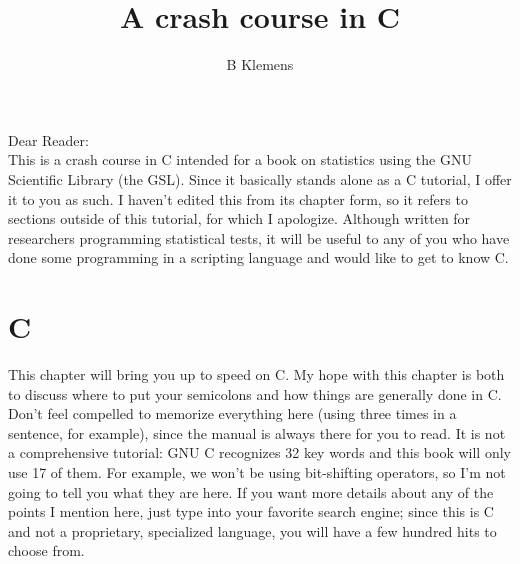 \documentclass[12pt]{article}
\begin{document}
	\title{A crash course in C}
	\author{B Klemens}
	\maketitle


Dear Reader:\\
This is a crash course in C intended for a book on statistics using the
GNU Scientific Library (the GSL).  Since it basically stands alone as a
C tutorial, I offer it to you as such. I haven't edited this from
its chapter form, so it refers to sections outside of this tutorial,
for which I apologize. Although written for researchers programming
statistical tests, it will be useful to any of you who have done some
programming in a scripting language and would like to get to know C.

\vskip 1cm

\section{C}
\fi


\long{}



This chapter will bring you up to speed on C.  
My hope with this chapter is both to discuss where to put your semicolons
and how things are generally done in C. Don't feel compelled to memorize
everything here (using  three times in a sentence, for
example), since the manual is always there for you to read.  It is not
a comprehensive tutorial: GNU C recognizes 32 key words and this book
will only use 17 of them. For example, we won't be using bit-shifting
operators, so I'm not going to tell you what they are here.
If you want more details about any of the points I mention here, just 
type  into your favorite search engine; since this
is C and not a proprietary, specialized language, you will have a few
hundred hits to choose from.
\end{document}
